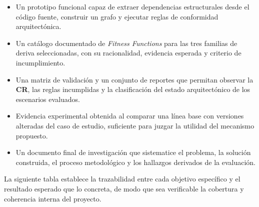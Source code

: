 \begin{itemize}
    \item Un prototipo funcional capaz de extraer dependencias estructurales desde el código fuente, construir un grafo y ejecutar reglas de conformidad arquitectónica.
    \item Un catálogo documentado de \textit{Fitness Functions} para las tres familias de deriva seleccionadas, con su racionalidad, evidencia esperada y criterio de incumplimiento.
    \item Una matriz de validación y un conjunto de reportes que permitan observar la \textbf{CR}, las reglas incumplidas y la clasificación del estado arquitectónico de los escenarios evaluados.
    \item Evidencia experimental obtenida al comparar una línea base con versiones alteradas del caso de estudio, suficiente para juzgar la utilidad del mecanismo propuesto.
    \item Un documento final de investigación que sistematice el problema, la solución construida, el proceso metodológico y los hallazgos derivados de la evaluación.
\end{itemize}

La siguiente tabla establece la trazabilidad entre cada objetivo específico y el resultado esperado que lo concreta, de modo que sea verificable la cobertura y coherencia interna del proyecto.

